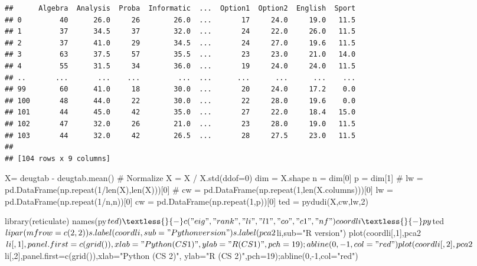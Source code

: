 \documentclass[
  10pt,
]{article}
\newenvironment{Shaded}{\begin{snugshade}}{\end{snugshade}}
\newcommand{\NormalTok}[1]{#1}
\begin{document}
\begin{verbatim}
##      Algebra  Analysis  Proba  Informatic  ...  Option1  Option2  English  Sport
## 0         40      26.0     26        26.0  ...       17     24.0     19.0   11.5
## 1         37      34.5     37        32.0  ...       24     22.0     26.0   11.5
## 2         37      41.0     29        34.5  ...       24     27.0     19.6   11.5
## 3         63      37.5     57        35.5  ...       23     23.0     21.0   14.0
## 4         55      31.5     34        36.0  ...       19     24.0     24.0   11.5
## ..       ...       ...    ...         ...  ...      ...      ...      ...    ...
## 99        60      41.0     18        30.0  ...       20     24.0     17.2    0.0
## 100       48      44.0     22        30.0  ...       22     28.0     19.6    0.0
## 101       44      45.0     42        35.0  ...       27     22.0     18.4   15.0
## 102       47      32.0     26        21.0  ...       23     28.0     19.0   11.5
## 103       44      32.0     42        26.5  ...       28     27.5     23.0   11.5
## 
## [104 rows x 9 columns]
\end{verbatim}

\begin{Shaded}
\begin{Highlighting}[]
\NormalTok{X= deugtab {-} deugtab.mean()}
\NormalTok{\# Normalize}
\NormalTok{X = X / X.std(ddof=0)}
\NormalTok{dim = X.shape}
\NormalTok{n = dim[0]}
\NormalTok{p = dim[1]}
\NormalTok{\# lw = pd.DataFrame(np.repeat(1/len(X),len(X)))[0]}
\NormalTok{\# cw = pd.DataFrame(np.repeat(1,len(X.columns)))[0]}
\NormalTok{lw = pd.DataFrame(np.repeat(1/n,n))[0]}
\NormalTok{cw = pd.DataFrame(np.repeat(1,p))[0]}
\NormalTok{ted = pydudi(X,cw,lw,2)}
\end{Highlighting}
\end{Shaded}

\begin{Shaded}
\begin{Highlighting}[]
\NormalTok{library(reticulate)}
\NormalTok{names(py$ted) \textless{}{-} c("eig","rank","li","l1","co","c1","nf")}
\NormalTok{coordli \textless{}{-} py$ted$li}
\NormalTok{par(mfrow=c(2,2))}
\NormalTok{s.label(coordli,sub="Python version")}
\NormalTok{s.label(pca2$li,sub="R version")}
\NormalTok{plot(coordli[,1],pca2$li[,1],panel.first=c(grid()),xlab="Python (CS 1)",}
\NormalTok{     ylab="R (CS 1)",pch=19);abline(0,{-}1,col="red")}
\NormalTok{plot(coordli[,2],pca2$li[,2],panel.first=c(grid()),xlab="Python (CS 2)",}
\NormalTok{     ylab="R (CS 2)",pch=19);abline(0,{-}1,col="red")}
\end{Highlighting}
\end{Shaded}
\end{document}
